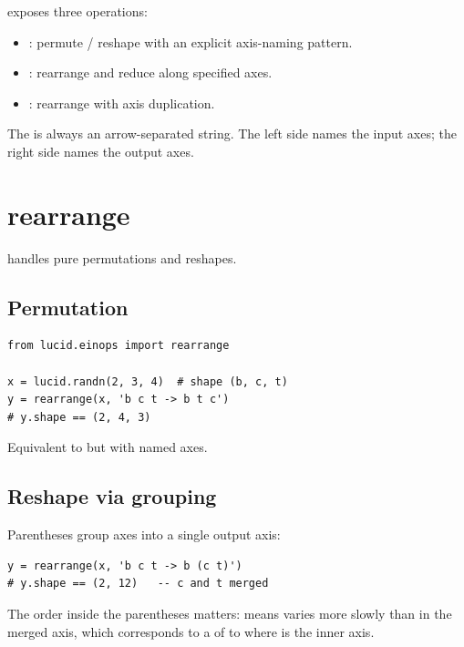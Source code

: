  exposes three operations:

\begin{itemize}
  \item {}:
    permute / reshape with an explicit axis-naming pattern.
  \item {}:
    rearrange and reduce along specified axes.
  \item {}: rearrange
    with axis duplication.
\end{itemize}

The  is always an arrow-separated string. The left
side names the input axes; the right side names the output axes.

\section{rearrange}
\label{sec:einops:rearrange}

 handles pure permutations and reshapes.

\subsection{Permutation}
\label{ssec:einops:permutation}

\begin{lstlisting}[style=lucid,language=LucidPython]
from lucid.einops import rearrange

x = lucid.randn(2, 3, 4)  # shape (b, c, t)
y = rearrange(x, 'b c t -> b t c')
# y.shape == (2, 4, 3)
\end{lstlisting}

Equivalent to  but with named axes.

\subsection{Reshape via grouping}
\label{ssec:einops:reshape_group}

Parentheses group axes into a single output axis:

\begin{lstlisting}[style=lucid,language=LucidPython]
y = rearrange(x, 'b c t -> b (c t)')
# y.shape == (2, 12)   -- c and t merged
\end{lstlisting}

The order inside the parentheses matters:  means
 varies more slowly than  in the merged axis,
which corresponds to a  of  to
 where  is the inner axis.

